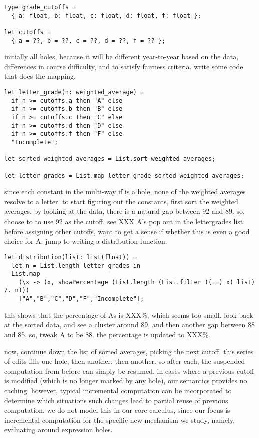 \begin{lstlisting}
type grade_cutoffs =
  { a: float, b: float, c: float, d: float, f: float };

let cutoffs =
  { a = ??, b = ??, c = ??, d = ??, f = ?? };
\end{lstlisting}

initially all holes, because it will be different year-to-year based on the
data, differences in course difficulty, and to satisfy fairness criteria.
%
write some code that does the mapping.

\begin{lstlisting}
let letter_grade(n: weighted_average) =
  if n >= cutoffs.a then "A" else
  if n >= cutoffs.b then "B" else
  if n >= cutoffs.c then "C" else
  if n >= cutoffs.d then "D" else
  if n >= cutoffs.f then "F" else
  "Incomplete";

let sorted_weighted_averages = List.sort weighted_averages;

let letter_grades = List.map letter_grade sorted_weighted_averages;
\end{lstlisting}

since each constant in the multi-way if is a hole, none of the weighted averages
resolve to a letter.
%
to start figuring out the constants, first sort the weighted averages.
%
by looking at the data, there is a natural gap between 92 and 89.
%
so, choose to to use 92 as the cutoff.
%
see XXX A's pop out in the lettergrades list.
%
before assigning other cutoffs, want to get a sense if whether this is even a
good choice for A.
%
jump to writing a distribution function.

\begin{lstlisting}
let distribution(list: list(float)) =
  let n = List.length letter_grades in
  List.map
    (\x -> (x, showPercentage (List.length (List.filter ((==) x) list) /. n)))
    ["A","B","C","D","F","Incomplete"];
\end{lstlisting}

this shows that the percentage of As is XXX\%, which seems too small.
%
look back at the sorted data, and see a cluster around 89, and then another gap
between 88 and 85.
%
so, tweak A to be 88.
%
the percentage is updated to XXX\%.

now, continue down the list of sorted averages, picking the next cutoff.
%
this series of edits fills one hole, then another, then another.
%
so after each, the suspended computation from before can simply be resumed.
%
in cases where a previous cutoff is modified (which is no longer marked by any
hole), our semantics provides no caching.
%
however, typical incremental computation can be incorporated to determine which
situations such changes lead to partial reuse of previous computation.
%
we do not model this in our core calculus, since our focus is incremental
computation for the specific new mechanism we study, namely, evaluating around
expression holes.

